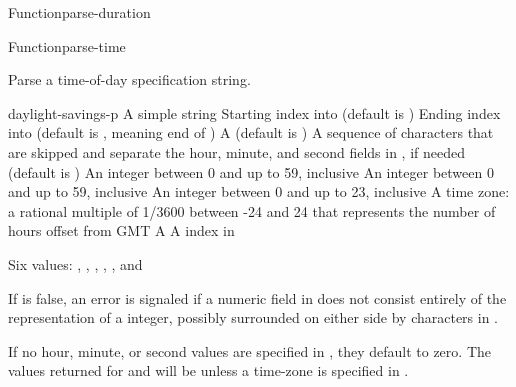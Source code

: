 \documentclass[10pt,twoside,english,pdftex]{article}
\begin{document}
\begin{functiondoc}{Function}{parse-duration}{%
    }
\end{functiondoc}


\begin{functiondoc}{Function}{parse-time}{%
    }
% 

\fnsyntax

\fnpurpose Parse a time-of-day specification string.

\fnpackage {} 

\fnmodule {}

\fnargs
\begin{args}{daylight-savings-p}
\arg[string] A simple string
\arg[start] Starting index into  (default is )
\arg[end] Ending index into  (default is \nil, meaning
end of )
 A  (default is \nil)
\arg[separators] A sequence of characters that are skipped and separate the
 hour, minute, and second fields in , if needed (default is 
 )
\arg[second] An integer between 0 and up to 59, inclusive
\arg[minute] An integer between 0 and up to 59, inclusive
\arg[hour] An integer between 0 and up to 23, inclusive
 A time zone: a rational multiple of 1/3600 between
 -24 and 24 that represents the number of hours offset from GMT
 A 
\arg[position] A index in 
\end{args}

\fnreturns Six values: , , ,
, , and

\fnerrors
%
If  is false, an error is signaled if a numeric field in
 does not consist entirely of the representation of a integer,
possibly surrounded on either side by characters in .

\fndescription
%
If no hour, minute, or second values are specified in , they
default to zero.  The values returned for  and
 will be \nil{} unless a time-zone is specified
in .


\end{functiondoc}
\end{document}
